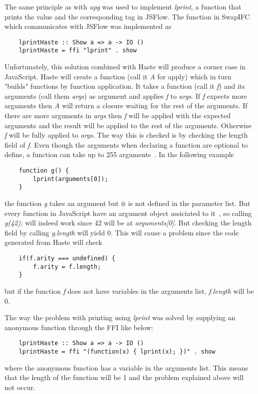 The same principle as with \emph{upg} was used to implement \emph{lprint}, a function that prints the value and the corresponding tag in JSFlow. The function in SwapIFC which communicates with JSFlow was implemented as
\begin{verbatim}
    lprintHaste :: Show a => a -> IO ()
    lprintHaste = ffi "lprint" . show
\end{verbatim}
Unfortunately, this solution combined with Haste will produce a corner case in JavaScript. Haste will create a function (call it \emph{A} for apply) which in turn "builds" functions by function application. It takes a function (call it \emph{f}) and its arguments (call them \emph{args}) as argument and applies \emph{f} to \emph{args}. If \emph{f} expects more arguments then \emph{A} will return a closure waiting for the rest of the arguments. If there are more arguments in \emph{args} then \emph{f} will be applied with the expected arguments and the result will be applied to the rest of the arguments. Otherwise \emph{f} will be fully applied to \emph{args}. The way this is checked is by checking the length field of \emph{f}. Even though the arguments when declaring a function are optional to define, a function can take up to 255 arguments~\cite{js-function}. In the following example
\begin{verbatim}
    function g() {
        lprint(arguments[0]);
    }
\end{verbatim}
the function \emph{g} takes an argument but it is not defined in the parameter list. But every function in JavaScript have an argument object assiciated to it~\cite{js-arguments}, so calling \emph{g(42);} will indeed work since 42 will be at \emph{arguments[0]}. But checking the length field by calling \emph{g.length} will yield 0. This will cause a problem since the code generated from Haste will check
\begin{verbatim}
    if(f.arity === undefined) {
        f.arity = f.length;
    }
\end{verbatim}
but if the function \emph{f} does not have variables in the arguments list, \emph{f.length} will be 0.

The way the problem with printing using \emph{lprint} was solved by supplying an anonymous function through the FFI like below:
\begin{verbatim}
    lprintHaste :: Show a => a -> IO ()
    lprintHaste = ffi "(function(x) { lprint(x); })" . show
\end{verbatim}
where the anonymous function has a variable in the arguments list. This means that the length of the function will be 1 and the problem explained above will not occur. 

